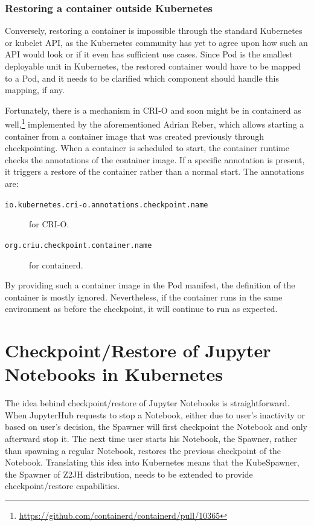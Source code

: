 \documentclass[
  digital,     %
  oneside,     %
  nosansbold,  %
  nocolorbold, %
  lof,         %
  nolot,         %
]{fithesis4}
\begin{document}
\subsection{Restoring a container outside Kubernetes}
\label{subsec:restoring}
Conversely, restoring a container is impossible through the standard Kubernetes or kubelet API, as the Kubernetes community has yet to agree upon how such an API would look or if it even has sufficient use cases. Since Pod is the smallest deployable unit in Kubernetes, the restored container would have to be mapped to a Pod, and it needs to be clarified which component should handle this mapping, if any.

Fortunately, there is a mechanism in CRI-O and soon might be in containerd as well,\footnote{\url{https://github.com/containerd/containerd/pull/10365}} implemented by the aforementioned Adrian Reber, which allows starting a container from a container image that was created previously through checkpointing. When a container is scheduled to start, the container runtime checks the annotations of the container image. If a specific annotation is present, it triggers a restore of the container rather than a normal start. The annotations are:
\begin{description}
    \item[\texttt{io.kubernetes.cri-o.annotations.checkpoint.name}] for CRI-O.
    \item[\texttt{org.criu.checkpoint.container.name}] for containerd.
\end{description}

By providing such a container image in the  Pod manifest, the definition of the container is mostly ignored. Nevertheless, if the container runs in the same environment as before the checkpoint, it will continue to run as expected.


\chapter{Checkpoint/Restore of Jupyter Notebooks in Kubernetes}
The idea behind checkpoint/restore of Jupyter Notebooks is straightforward. When JupyterHub requests to stop a Notebook, either due to user's inactivity or based on user's decision, the Spawner will first checkpoint the Notebook and only afterward stop it. The next time user starts his Notebook, the Spawner, rather than spawning a regular Notebook, restores the previous checkpoint of the Notebook. Translating this idea into Kubernetes means that the KubeSpawner, the Spawner of Z2JH distribution, needs to be extended to provide checkpoint/restore capabilities. 
\end{document}
